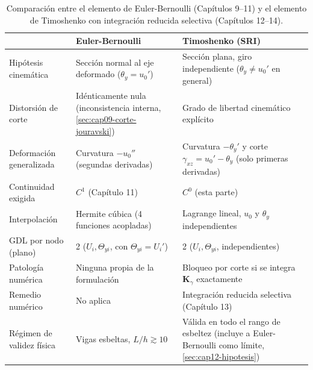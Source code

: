 \begin{table}[htbp]
\centering
\caption{Comparación entre el elemento de Euler-Bernoulli (Capítulos 9--11) y el elemento de Timoshenko con integración reducida selectiva (Capítulos 12--14).}
\label{tab:cap14-comparacion-eb-timoshenko}
\begin{tabular}{@{}p{3.6cm}p{4.4cm}p{4.6cm}@{}}
\toprule
& \textbf{Euler-Bernoulli} & \textbf{Timoshenko (SRI)} \\
\midrule
Hipótesis cinemática & Sección normal al eje deformado ($\theta_y=u_0'$) & Sección plana, giro independiente ($\theta_y\neq u_0'$ en general) \\
Distorsión de corte & Idénticamente nula (inconsistencia interna, \cref{sec:cap09-corte-jouravski}) & Grado de libertad cinemático explícito \\
Deformación generalizada & Curvatura $-u_0''$ (segundas derivadas) & Curvatura $-\theta_y'$ y corte $\gamma_{xz}=u_0'-\theta_y$ (solo primeras derivadas) \\
Continuidad exigida & $C^1$ (Capítulo 11) & $C^0$ (esta parte) \\
Interpolación & Hermite cúbica (4 funciones acopladas) & Lagrange lineal, $u_0$ y $\theta_y$ independientes \\
GDL por nodo (plano) & 2 ($U_i,\Theta_{yi}$, con $\Theta_{yi}=U_i'$) & 2 ($U_i,\Theta_{yi}$, independientes) \\
Patología numérica & Ninguna propia de la formulación & Bloqueo por corte si se integra $\bm K_\gamma$ exactamente \\
Remedio numérico & No aplica & Integración reducida selectiva (Capítulo 13) \\
Régimen de validez física & Vigas esbeltas, $L/h\gtrsim10$ & Válida en todo el rango de esbeltez (incluye a Euler-Bernoulli como límite, \cref{sec:cap12-hipotesis}) \\
\bottomrule
\end{tabular}
\end{table}

